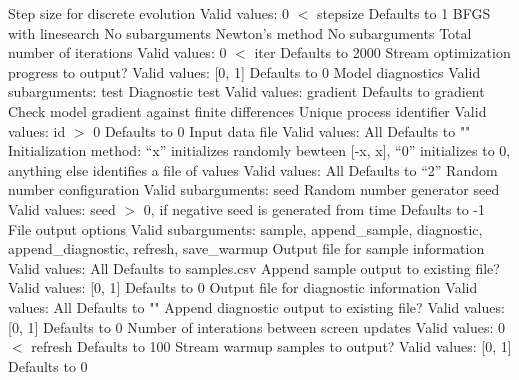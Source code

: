 \begin{description}
          {Step size for discrete evolution}
          {Valid values: 0 $<$ stepsize}
          {Defaults to 1}
%
        {BFGS with linesearch}
        {No subarguments}
%
        {Newton's method}
        {No subarguments}
%
      {Total number of iterations}
      {Valid values: 0 $<$ iter}
      {Defaults to 2000}
%
      {Stream optimization progress to output?}
      {Valid values: [0, 1]}
      {Defaults to 0}
%
    {Model diagnostics}
    {Valid subarguments: test}
%
      {Diagnostic test}
      {Valid values: gradient}
      {Defaults to gradient}
%
        {Check model gradient against finite differences}
%
  {Unique process identifier}
  {Valid values: id $>$ 0}
  {Defaults to 0}
%
  {Input data file}
  {Valid values: All}
  {Defaults to ""}
%
  {Initialization method: ``x'' initializes randomly bewteen [-x, x], ``0'' initializes to 0, anything else identifies a file of values}
  {Valid values: All}
  {Defaults to ``2''}
%
  {Random number configuration}
  {Valid subarguments: seed}
%
    {Random number generator seed}
    {Valid values: seed $>$ 0, if negative seed is generated from time}
    {Defaults to -1}
%
  {File output options}
  {Valid subarguments: sample, append\_sample, diagnostic, append\_diagnostic, refresh, save\_warmup}
%
    {Output file for sample information}
    {Valid values: All}
    {Defaults to samples.csv}
%
    {Append sample output to existing file?}
    {Valid values: [0, 1]}
    {Defaults to 0}
%
    {Output file for diagnostic information}
    {Valid values: All}
    {Defaults to ""}
%
    {Append diagnostic output to existing file?}
    {Valid values: [0, 1]}
    {Defaults to 0}
%
    {Number of interations between screen updates}
    {Valid values: 0 $<$ refresh}
    {Defaults to 100}
%
    {Stream warmup samples to output?}
    {Valid values: [0, 1]}
    {Defaults to 0}
%
\end{description}

